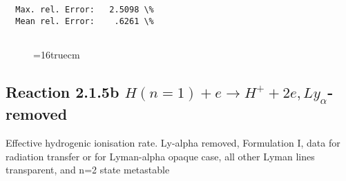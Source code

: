 \documentclass[12pt,dvipdfmx]{article}
\begin{document}
\begin{small}
\begin{verbatim}
  Max. rel. Error:   2.5098 \%
  Mean rel. Error:    .6261 \%


\end{verbatim}\end{small}
\begin{figure} \label{2.1.5a}
\epsfxsize=16truecm
\end{figure}
\newpage

\subsection{
Reaction 2.1.5b  $H(n=1) + e \rightarrow H^+ + 2e, Ly_\alpha$-removed}


   Effective hydrogenic ionisation rate.
   Ly-alpha removed, Formulation I, data for radiation transfer
   or for Lyman-alpha opaque case, all other Lyman lines transparent,
   and n=2 state metastable
\end{document}
